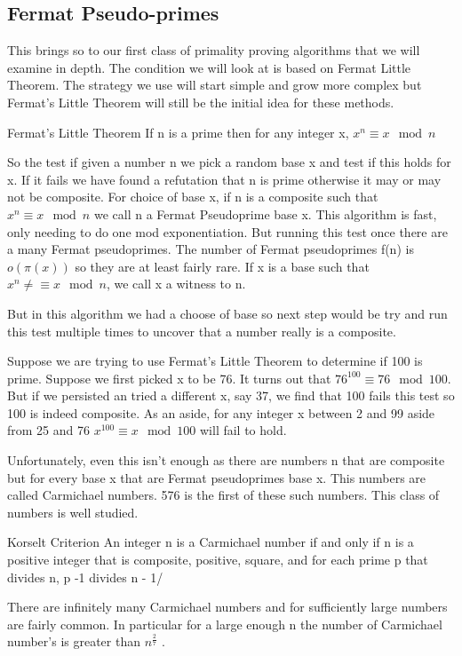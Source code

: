 \documentclass{article}
\begin{document}
\subsection{Fermat Pseudo-primes}
This brings so to our first class of primality proving algorithms that we will examine in depth. The condition we will look at is based on Fermat Little Theorem. The strategy we use will start simple and grow more complex but Fermat's Little Theorem will still be the initial idea for these methods. 
\begin{theorem}{Fermat's Little Theorem}
If n is a prime then for any integer x, $x^n \equiv x \mod n$
\end{theorem}
So the test if given a number n we pick a random base x and test if this holds for x. If it fails we have found a refutation that n is prime otherwise it may or may not be composite. For choice of base x, if n is a composite such that $x^n \equiv x \mod n$ we call n a Fermat Pseudoprime base x. This algorithm is fast, only needing to do one mod exponentiation. But running this test once there are a many Fermat pseudoprimes. The number of Fermat pseudoprimes f(n) is $o(\pi(x))$ so they are at least fairly rare. If x is a base such that $x^n \neq \equiv x \mod n$, we call x a witness to n. 

But in this algorithm we had a choose of base so next step would be try and run this test multiple times to uncover that a number really is a composite. 
\begin{example}
Suppose we are trying to use Fermat's Little Theorem to determine if 100 is prime. Suppose we first picked x to be 76. It turns out that $76^{100} \equiv 76 \mod 100$. But if we persisted an tried a different x, say 37, we find that 100 fails this test so 100 is indeed composite. As an aside,  for any integer x between 2 and 99 aside from 25 and 76 $x^100 \equiv x \mod 100$ will fail to hold. 
\end{example}
Unfortunately, even this isn't enough as there are numbers n that are composite but for every base x that are Fermat pseudoprimes base x. This numbers are called Carmichael numbers. 576 is the first of these such numbers. This class of numbers is well studied. 
\begin{theorem}{Korselt Criterion}
An integer n is a Carmichael number if and only if n is a positive integer that is composite, positive, square, and for each prime p that divides n, p -1 divides n - 1/
\end{theorem}
There are infinitely many Carmichael numbers and for sufficiently large numbers are fairly common. In particular for a large enough n the number of Carmichael number's is greater than $n^{\frac{2}{7}}$ \cite{alford1994there}.  
\end{document}
